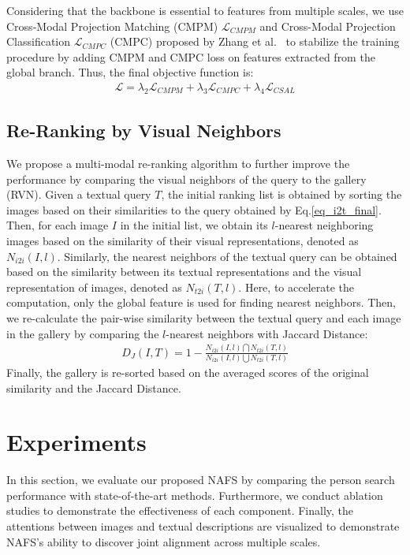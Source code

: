\documentclass[final]{cvpr}
\begin{document}
Considering that the backbone is essential to features from multiple scales, we use Cross-Modal Projection Matching (CMPM) $\mathcal{L}_{CMPM}$ and Cross-Modal Projection Classification $\mathcal{L}_{CMPC}$ (CMPC) proposed by Zhang et al.~\cite{zhang2018deep} to stabilize the training procedure by adding CMPM and CMPC loss on features extracted from the global branch. Thus, the final objective function is:
\begin{align}\label{total_loss}
    \mathcal{L}=\lambda_{2}\mathcal{L}_{CMPM}+\lambda_{3}\mathcal{L}_{CMPC}+\lambda_{4}\mathcal{L}_{CSAL}
\end{align}





\subsection{Re-Ranking by Visual Neighbors}
We propose a multi-modal re-ranking algorithm to further improve the performance by comparing the visual neighbors of the query to the gallery (RVN). 
Given a textual query $T$, the initial ranking list is obtained by sorting the images based on their similarities to the query obtained by Eq.\ref{eq_i2t_final}. 
Then, for each image $I$ in the initial list, we obtain its $l$-nearest neighboring images based on the similarity of their visual representations, denoted as $N_{i2i}(I, l)$. 
Similarly, the nearest neighbors of the textual query can be obtained based on the similarity between its textual representations and the visual representation of images, denoted as $N_{t2i}(T, l)$. 
Here, to accelerate the computation, only the global feature is used for finding nearest neighbors. Then, we re-calculate the pair-wise similarity between the textual query and each image in the gallery by comparing the $l$-nearest neighbors with Jaccard Distance: 
\begin{align}
    D_J(I, T)=1 - \frac{N_{i2i}(I, l)\bigcap N_{t2i}(T, l)}{N_{i2i}(I, l)\bigcup N_{t2i}(T, l)}
\end{align}
Finally, the gallery is re-sorted based on the averaged scores of the original similarity and the Jaccard Distance. 

\section{Experiments}
In this section, we evaluate our proposed NAFS by comparing the person search performance with state-of-the-art methods. Furthermore, we conduct ablation studies to demonstrate the effectiveness of each component. Finally, the attentions between images and textual descriptions are visualized to demonstrate NAFS's ability to discover joint alignment across multiple scales.
\end{document}
